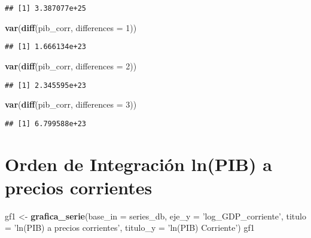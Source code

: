 \documentclass[]{book}
\newenvironment{Shaded}{\begin{snugshade}}{\end{snugshade}}
\newcommand{\KeywordTok}[1]{\textcolor[rgb]{0.13,0.29,0.53}{\textbf{#1}}}
\newcommand{\DataTypeTok}[1]{\textcolor[rgb]{0.13,0.29,0.53}{#1}}
\newcommand{\DecValTok}[1]{\textcolor[rgb]{0.00,0.00,0.81}{#1}}
\newcommand{\StringTok}[1]{\textcolor[rgb]{0.31,0.60,0.02}{#1}}
\newcommand{\NormalTok}[1]{#1}
\theoremstyle{definition}
\theoremstyle{definition}
\theoremstyle{definition}
\theoremstyle{remark}
\begin{document}
\begin{verbatim}
## [1] 3.387077e+25
\end{verbatim}

\begin{Shaded}
\begin{Highlighting}[]
\KeywordTok{var}\NormalTok{(}\KeywordTok{diff}\NormalTok{(pib_corr, }\DataTypeTok{differences =} \DecValTok{1}\NormalTok{))}
\end{Highlighting}
\end{Shaded}

\begin{verbatim}
## [1] 1.666134e+23
\end{verbatim}

\begin{Shaded}
\begin{Highlighting}[]
\KeywordTok{var}\NormalTok{(}\KeywordTok{diff}\NormalTok{(pib_corr, }\DataTypeTok{differences =} \DecValTok{2}\NormalTok{))}
\end{Highlighting}
\end{Shaded}

\begin{verbatim}
## [1] 2.345595e+23
\end{verbatim}

\begin{Shaded}
\begin{Highlighting}[]
\KeywordTok{var}\NormalTok{(}\KeywordTok{diff}\NormalTok{(pib_corr, }\DataTypeTok{differences =} \DecValTok{3}\NormalTok{))}
\end{Highlighting}
\end{Shaded}

\begin{verbatim}
## [1] 6.799588e+23
\end{verbatim}

\chapter{Orden de Integración ln(PIB) a precios
corrientes}\label{orden-de-integracion-lnpib-a-precios-corrientes}

\begin{Shaded}
\begin{Highlighting}[]
\NormalTok{gf1 <-}\StringTok{ }\KeywordTok{grafica_serie}\NormalTok{(}\DataTypeTok{base_in =}\NormalTok{ series_db, }
                      \DataTypeTok{eje_y =} \StringTok{'log_GDP_corriente'}\NormalTok{, }
                      \DataTypeTok{titulo =} \StringTok{'ln(PIB) a precios corrientes'}\NormalTok{, }
                      \DataTypeTok{titulo_y =} \StringTok{'ln(PIB) Corriente'}\NormalTok{)}
\NormalTok{gf1}
\end{Highlighting}
\end{Shaded}
\end{document}
